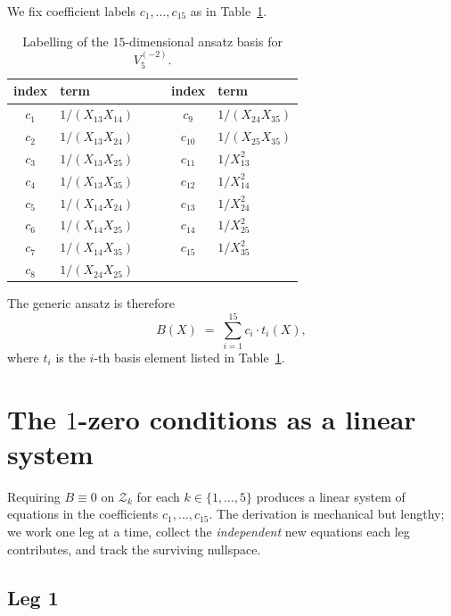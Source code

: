 \documentclass[11pt]{article}
\theoremstyle{plain}
\theoremstyle{definition}
\newcommand{\cZ}{\mathcal{Z}}
\begin{document}
We fix coefficient labels $c_1, \ldots, c_{15}$ as in Table~\ref{tab:basis}.

\begin{table}[h]
\centering
\small
\begin{tabular}{clcccl}
\toprule
index & term & & & index & term \\
\midrule
$c_1$    & $1/(X_{13} X_{14})$ & & & $c_9$    & $1/(X_{24} X_{35})$ \\
$c_2$    & $1/(X_{13} X_{24})$ & & & $c_{10}$ & $1/(X_{25} X_{35})$ \\
$c_3$    & $1/(X_{13} X_{25})$ & & & $c_{11}$ & $1/X_{13}^2$ \\
$c_4$    & $1/(X_{13} X_{35})$ & & & $c_{12}$ & $1/X_{14}^2$ \\
$c_5$    & $1/(X_{14} X_{24})$ & & & $c_{13}$ & $1/X_{24}^2$ \\
$c_6$    & $1/(X_{14} X_{25})$ & & & $c_{14}$ & $1/X_{25}^2$ \\
$c_7$    & $1/(X_{14} X_{35})$ & & & $c_{15}$ & $1/X_{35}^2$ \\
$c_8$    & $1/(X_{24} X_{25})$ & & & & \\
\bottomrule
\end{tabular}
\caption{Labelling of the $15$-dimensional ansatz basis for $V_5^{(-2)}$.}
\label{tab:basis}
\end{table}

The generic ansatz is therefore
\begin{equation}
B(X) \;=\; \sum_{i=1}^{15} c_i \cdot t_i(X),
\label{eq:ansatz}
\end{equation}
where $t_i$ is the $i$-th basis element listed in Table~\ref{tab:basis}.

\section{The $1$-zero conditions as a linear system}

Requiring $B \equiv 0$ on $\cZ_k$ for each $k \in \{1, \ldots, 5\}$ produces a linear
system of equations in the coefficients $c_1, \ldots, c_{15}$. The derivation is
mechanical but lengthy; we work one leg at a time, collect the \emph{independent}
new equations each leg contributes, and track the surviving nullspace.

\subsection{Leg 1}\label{sec:leg1}
\end{document}
